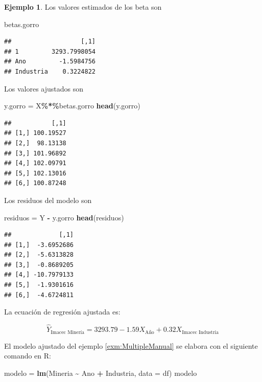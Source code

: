 \documentclass[
  11pt,
]{book}
\newenvironment{Shaded}{\begin{snugshade}}{\end{snugshade}}
\newcommand{\AttributeTok}[1]{\textcolor[rgb]{0.13,0.29,0.53}{#1}}
\newcommand{\FunctionTok}[1]{\textcolor[rgb]{0.13,0.29,0.53}{\textbf{#1}}}
\newcommand{\NormalTok}[1]{#1}
\newcommand{\OtherTok}[1]{\textcolor[rgb]{0.56,0.35,0.01}{#1}}
\newcommand{\SpecialCharTok}[1]{\textcolor[rgb]{0.81,0.36,0.00}{\textbf{#1}}}
\theoremstyle{definition}
\theoremstyle{definition}
\newtheorem{example}{Ejemplo}[chapter]
\theoremstyle{definition}
\theoremstyle{definition}
\theoremstyle{remark}
\begin{document}
\begin{example}
Los valores estimados de los beta son

\begin{Shaded}
\begin{Highlighting}[]
\NormalTok{betas.gorro}
\end{Highlighting}
\end{Shaded}

\begin{verbatim}
##                   [,1]
## 1         3293.7998054
## Ano         -1.5984756
## Industria    0.3224822
\end{verbatim}

Los valores ajustados son

\begin{Shaded}
\begin{Highlighting}[]
\NormalTok{y.gorro }\OtherTok{=}\NormalTok{ X}\SpecialCharTok{\%*\%}\NormalTok{betas.gorro}
\FunctionTok{head}\NormalTok{(y.gorro)}
\end{Highlighting}
\end{Shaded}

\begin{verbatim}
##           [,1]
## [1,] 100.19527
## [2,]  98.13138
## [3,] 101.96892
## [4,] 102.09791
## [5,] 102.13016
## [6,] 100.87248
\end{verbatim}

Los residuos del modelo son

\begin{Shaded}
\begin{Highlighting}[]
\NormalTok{residuos }\OtherTok{=}\NormalTok{ Y }\SpecialCharTok{{-}}\NormalTok{ y.gorro}
\FunctionTok{head}\NormalTok{(residuos)}
\end{Highlighting}
\end{Shaded}

\begin{verbatim}
##             [,1]
## [1,]  -3.6952686
## [2,]  -5.6313828
## [3,]  -0.8689205
## [4,] -10.7979133
## [5,]  -1.9301616
## [6,]  -4.6724811
\end{verbatim}

La ecuación de regresión ajustada es:

\[
\widehat{Y}_{\text{Imacec Minería}} = 3293.79 -1.59X_{\text{Año}} + 0.32X_{\text{Imacec Industria}}
\]
\end{example}

El modelo ajustado del ejemplo \ref{exm:MultipleManual} se elabora con el siguiente comando en R:

\begin{Shaded}
\begin{Highlighting}[]
\NormalTok{modelo }\OtherTok{=} \FunctionTok{lm}\NormalTok{(Mineria }\SpecialCharTok{\textasciitilde{}}\NormalTok{ Ano }\SpecialCharTok{+}\NormalTok{ Industria, }\AttributeTok{data =}\NormalTok{ df)}
\NormalTok{modelo}
\end{Highlighting}
\end{Shaded}
\end{document}
